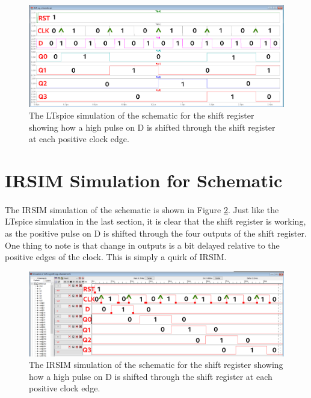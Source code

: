 \documentclass{article}
\begin{document}
  \begin{figure}[H]
    \centering
    \includegraphics[width=\linewidth, frame]{screenshots/schem-spice-graph.png}
    \caption{The LTspice simulation of the schematic for the shift register showing how a high pulse on D is shifted through the shift register at each positive clock edge.}
    \label{fig:schem-spice-graph}
  \end{figure}

\section{IRSIM Simulation for Schematic}
  \paragraph{}
  The IRSIM simulation of the schematic is shown in Figure \ref{fig:schem-irsim}. Just like the LTspice simulation in the last section, it is clear that the shift register is working, as the positive pulse on D is shifted through the four outputs of the shift register. One thing to note is that change in outputs is a bit delayed relative to the positive edges of the clock. This is simply a quirk of IRSIM.



  \begin{figure}[H]
    \centering
    \includegraphics[width=\linewidth, frame]{screenshots/schem-irsim.png}
    \caption{The IRSIM simulation of the schematic for the shift register showing how a high pulse on D is shifted through the shift register at each positive clock edge.}
    \label{fig:schem-irsim}
  \end{figure}
\end{document}
